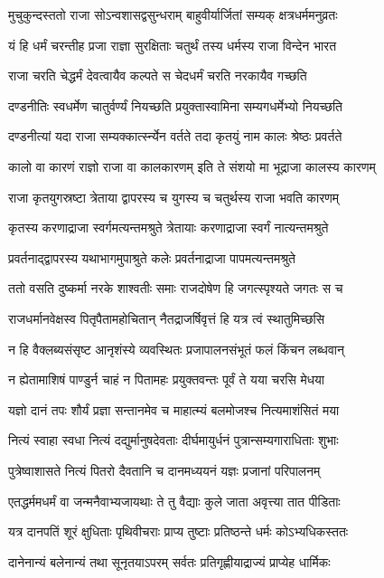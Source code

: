 \twolineshloka
{मुचुकुन्दस्ततो राजा सोऽन्वशासद्वसुन्धराम्}
{बाहुवीर्यार्जितां सम्यक् क्षत्रधर्ममनुव्रतः}


\twolineshloka
{यं हि धर्मं चरन्तीह प्रजा राज्ञा सुरक्षिताः}
{चतुर्थं तस्य धर्मस्य राजा विन्देन भारत}


\twolineshloka
{राजा चरति चेद्धर्मं देवत्वायैव कल्पते}
{स चेदधर्मं चरति नरकायैव गच्छति}


\twolineshloka
{दण्डनीतिः स्वधर्मेण चातुर्वर्ण्यं नियच्छति}
{प्रयुक्तास्वामिना सम्यगधर्मेभ्यो नियच्छति}


\twolineshloka
{दण्डनीत्यां यदा राजा सम्यक्कार्त्स्न्येन वर्तते}
{तदा कृतयुं नाम कालः श्रेष्ठः प्रवर्तते}


\twolineshloka
{कालो वा कारणं राज्ञो राजा वा कालकारणम्}
{इति ते संशयो मा भूद्राजा कालस्य कारणम्}


\twolineshloka
{राजा कृतयुगस्रष्टा त्रेताया द्वापरस्य च}
{युगस्य च चतुर्थस्य राजा भवति कारणम्}


\twolineshloka
{कृतस्य करणाद्राजा स्वर्गमत्यन्तमश्रुते}
{त्रेतायाः करणाद्राजा स्वर्गं नात्यन्तमश्रुते}


\twolineshloka
{प्रवर्तनाद्द्वापरस्य यथाभागमुपाश्रुते}
{कलेः प्रवर्तनाद्राजा पापमत्यन्तमश्रुते}


\twolineshloka
{ततो वसति दुष्कर्मा नरके शाश्वतीः समाः}
{राजदोषेण हि जगत्स्पृश्यते जगतः स च}


\twolineshloka
{राजधर्मानवेक्षस्व पितृपैतामहोचितान्}
{नैतद्राजर्षिवृत्तं हि यत्र त्वं स्थातुमिच्छसि}


\twolineshloka
{न हि वैक्लब्यसंसृष्ट आनृशंस्ये व्यवस्थितः}
{प्रजापालनसंभूतं फलं किंचन लब्धवान्}


\twolineshloka
{न ह्येतामाशिषं पाण्डुर्न चाहं न पितामहः}
{प्रयुक्तवन्तः पूर्वं ते यया चरसि मेधया}


\twolineshloka
{यज्ञो दानं तपः शौर्यं प्रज्ञा सन्तानमेव च}
{माहात्म्यं बलमोजश्च नित्यमाशंसितं मया}


\twolineshloka
{नित्यं स्वाहा स्वधा नित्यं दद्युर्मानुषदेवताः}
{दीर्घमायुर्धनं पुत्रान्सम्यगाराधिताः शुभाः}


\twolineshloka
{पुत्रेष्वाशासते नित्यं पितरो दैवतानि च}
{दानमध्ययनं यज्ञः प्रजानां परिपालनम्}


\twolineshloka
{एतद्धर्ममधर्मं वा जन्मनैवाभ्यजायथाः}
{ते तु वैद्याः कुले जाता अवृत्त्या तात पीडिताः}


\twolineshloka
{यत्र दानपतिं शूरं क्षुधिताः पृथिवीचराः}
{प्राप्य तुष्टाः प्रतिष्ठन्ते धर्मः कोऽभ्यधिकस्ततः}


\twolineshloka
{दानेनान्यं बलेनान्यं तथा सूनृतयाऽपरम्}
{सर्वतः प्रतिगृह्णीयाद्राज्यं प्राप्येह धार्मिकः}



